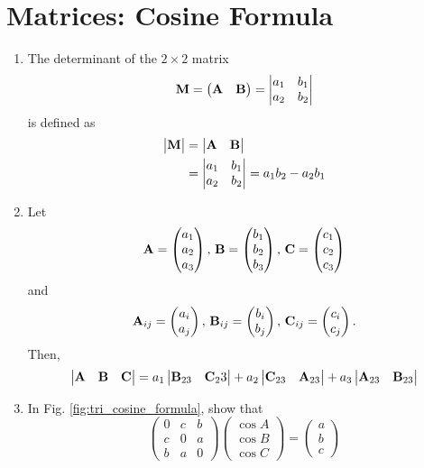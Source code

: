 \section{Matrices: Cosine Formula}
\begin{enumerate}[label=\thesection.\arabic*.,ref=\thesection.\theenumi]
\item The determinant of the $2 \times 2$ matrix 
\begin{align}  
  \mathbf{M} = \begin{pmatrix}\mathbf{A} & \mathbf{B}\end{pmatrix}=\begin{vmatrix}a_1 & b_1\\a_2 & b_2\end{vmatrix}
\end{align}
is defined as
\begin{align}
  \label{eq:det2d}
  \mydet{\vec{M}} &= \mydet{\vec{A} & \vec{B}} 
  \\
  &= \mydet{a_1 & b_1\\a_2 & b_2} = a_1b_2 - a_2 b_1
\end{align}
%
\item Let 
\begin{align}
  \mathbf{A} = \begin{pmatrix}a_1\\a_2 \\ a_3\end{pmatrix},\, 
  \mathbf{B} = \begin{pmatrix}b_1\\b_2 \\ b_3\end{pmatrix},\,
  \mathbf{C} = \begin{pmatrix}c_1\\c_2 \\ c_3\end{pmatrix}
\end{align}
and 
\begin{align}
  \mathbf{A}_{ij} = \begin{pmatrix}a_i\\a_j\end{pmatrix}, \,
  \mathbf{B}_{ij} = \begin{pmatrix}b_i\\b_j\end{pmatrix}, \,
  \mathbf{C}_{ij} = \begin{pmatrix}c_i\\c_j\end{pmatrix}. 
\end{align}
Then, \begin{align}  
	\begin{vmatrix}\mathbf{A} & \mathbf{B} & \mathbf{C}\end{vmatrix} = a_1 \begin{vmatrix}\mathbf{B}_{23} & \mathbf{C}_23\end{vmatrix} +a_2 \begin{vmatrix}\mathbf{C}_{23} & \mathbf{A}_{23}\end{vmatrix} +a_3\begin{vmatrix}\mathbf{A}_{23} & \mathbf{B}_{23}\end{vmatrix} 
\end{align}



\item
In Fig. \ref{fig:tri_cosine_formula}, show that
%
\begin{equation}
\label{eq:tri_cos_mat}
\begin{pmatrix}
0 & c & b \\
c & 0 & a \\
b & a & 0
\end{pmatrix}
\begin{pmatrix}
\cos A \\
\cos B \\
\cos C
\end{pmatrix}
= 
\begin{pmatrix}
a\\
b\\
c
\end{pmatrix}
\end{equation}
%
%
\begin{figure}[!ht]
	\begin{center}
		

\end{center}
\end{figure}
\end{enumerate}
